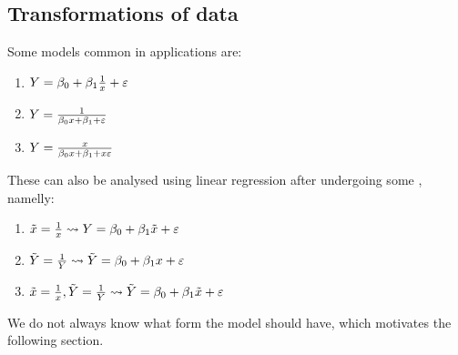 
        
            
        
        
        


\subsection{Transformations of data}
Some models common in applications are:
\begin{enumerate}
    \item $Y=\beta_0+\beta_1\frac{1}{x}+\varepsilon$
    \item $Y=\frac{1}{\beta_0 x + \beta_1 + \varepsilon}$
    \item $Y=\frac{x}{\beta_0 x + \beta_1 + x\varepsilon}$
\end{enumerate}
These can also be analysed using linear regression after undergoing some , namelly:
\begin{enumerate}
    \item $\tilde{x}=\frac{1}{x} \leadsto Y=\beta_0+\beta_1\tilde{x}+\varepsilon$
    \item $\tilde{Y}=\frac{1}{Y} \leadsto \tilde{Y}=\beta_0+\beta_1{x}+\varepsilon$
    \item $\tilde{x}=\frac{1}{x},\tilde{Y}=\frac{1}{Y} \leadsto \tilde{Y}=\beta_0+\beta_1\tilde{x}+\varepsilon$
\end{enumerate}
We do not always know what form the model should have, which motivates the following section.

